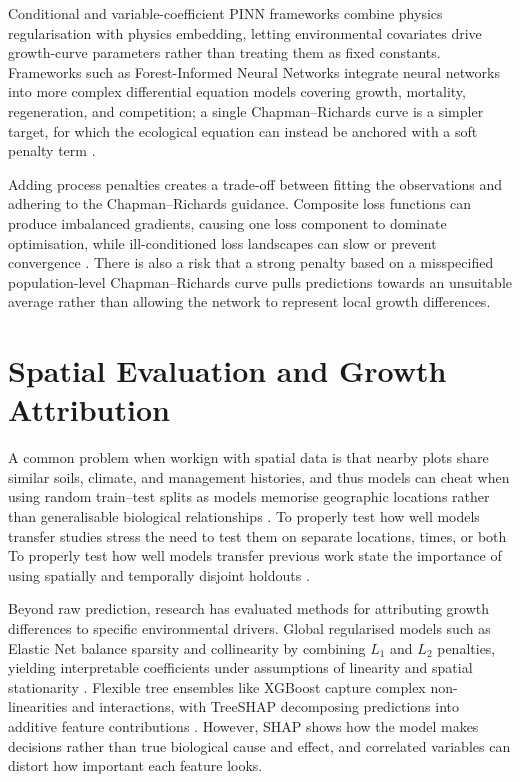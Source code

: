 \documentclass[logo,msc,ai]{infthesis}           %
\begin{document}
Conditional and variable-coefficient PINN frameworks combine physics regularisation with physics embedding, letting environmental covariates drive growth-curve parameters rather than treating them as fixed constants. Frameworks such as Forest-Informed Neural Networks integrate neural networks into more complex differential equation models covering growth, mortality, regeneration, and competition; a single Chapman--Richards curve is a simpler target, for which the ecological equation can instead be anchored with a soft penalty term \cite{pichler2025Inferring_C4_NN}.

Adding process penalties creates a trade-off between fitting the observations and adhering to the Chapman--Richards guidance. Composite loss functions can produce imbalanced gradients, causing one loss component to dominate optimisation, while ill-conditioned loss landscapes can slow or prevent convergence \cite{wang2021Understanding_C4_NN,rathore2024Challenges_C4_NN}. There is also a risk that a strong penalty based on a misspecified population-level Chapman--Richards curve pulls predictions towards an unsuitable average rather than allowing the network to represent local growth differences.


\section{Spatial Evaluation and Growth Attribution}

A common problem when workign with spatial data is that nearby plots share similar soils, climate, and management histories, and thus models can cheat when using random train--test splits as models memorise geographic locations rather than generalisable biological relationships \cite{ploton2020Spatial_C5_EVAL, karasiak2022Spatial_C5_EVAL}. To properly test how well models transfer studies stress the need to test them on separate locations, times, or both To properly test how well models transfer previous work state the importance of using spatially and temporally disjoint holdouts \cite{meyer2018Improving_C5_EVAL}.

Beyond raw prediction, research has evaluated methods for attributing growth differences to specific environmental drivers. Global regularised models such as Elastic Net balance sparsity and collinearity by combining $L_1$ and $L_2$ penalties, yielding interpretable coefficients under assumptions of linearity and spatial stationarity \cite{zou2005Regularization_C4_NN}. Flexible tree ensembles like XGBoost capture complex non-linearities and interactions, with TreeSHAP decomposing predictions into additive feature contributions \cite{chen2016XGBoost_C4_NN,lundberg2017Unified_C7_XAI}. However, SHAP shows how the model makes decisions rather than true biological cause and effect, and correlated variables can distort how important each feature looks.
\end{document}
